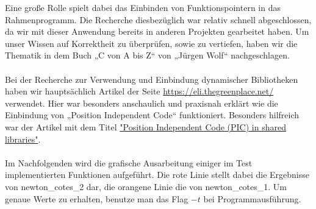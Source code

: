 \documentclass[course=erap]{aspdoc}
\begin{document}
Eine große Rolle spielt dabei das Einbinden von Funktionspointern in das Rahmenprogramm. Die Recherche diesbezüglich war relativ schnell abgeschlossen, da wir mit dieser Anwendung bereits in anderen Projekten gearbeitet haben. Um unser Wissen auf Korrektheit zu überprüfen, sowie zu vertiefen, haben wir die Thematik in dem Buch „C von A bis Z“ von „Jürgen Wolf“ nachgeschlagen.\\
\\
Bei der Recherche zur Verwendung und Einbindung dynamischer Bibliotheken haben wir hauptsächlich Artikel der Seite \url{https://eli.thegreenplace.net/} verwendet. Hier war besonders anschaulich und praxisnah erklärt wie die Einbindung von „Position Independent Code“ funktioniert. Besonders hilfreich war der Artikel mit dem Titel \hyperref[link1]{"Position Independent Code (PIC) in shared libraries"}.\\
\\
Im Nachfolgenden wird die grafische Ausarbeitung einiger im Test implementierten Funktionen aufgeführt. Die rote Linie stellt dabei die Ergebnisse von newton\_cotes\_2 dar, die orangene Linie die von newton\_cotes\_1. Um genaue Werte zu erhalten, benutze man das Flag $-t$ bei Programmausführung.\\
\end{document}
